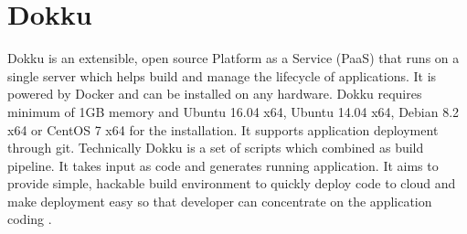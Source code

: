 \section{Dokku}
Dokku \cite{hid-sp18-402-www-dokku} is an extensible, open source
Platform as a Service (PaaS) that runs on a single server which helps
build and manage the lifecycle of applications. It is powered by
Docker and can be installed on any hardware. Dokku requires minimum of
1GB memory and Ubuntu 16.04 x64, Ubuntu 14.04 x64, Debian 8.2 x64 or
CentOS 7 x64 for the installation. It supports application deployment
through git. Technically Dokku is a set of scripts which combined as
build pipeline. It takes input as code and generates running
application. It aims to provide simple, hackable build environment to
quickly deploy code to cloud and make deployment easy so that
developer can concentrate on the application coding
\cite{hid-sp18-402-www-dokkuG}.
